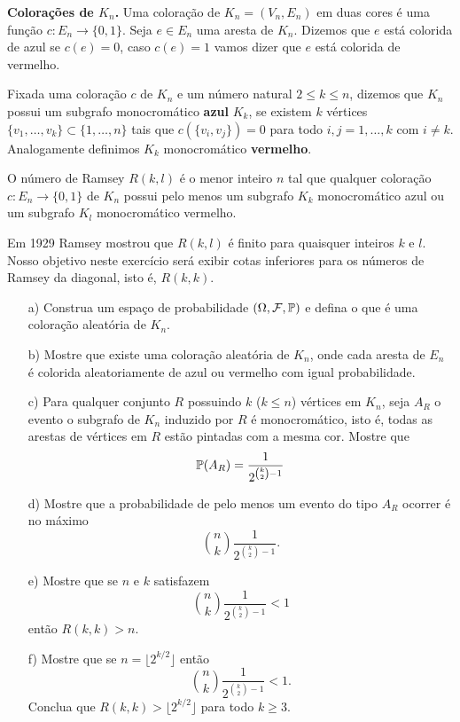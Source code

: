\begin{enumerate}[leftmargin=*]
{\bf Colorações de $K_n$.}
Uma coloração de $K_n=(V_n,E_n)$ em duas cores 
é uma função $c:E_n\to \{0,1\}$.
Seja $e\in E_n$ uma aresta de $K_n$. 
Dizemos que $e$ está colorida de azul se $c(e)=0$, 
caso $c(e)=1$ vamos dizer que $e$ está colorida de vermelho.

Fixada uma coloração $c$ de $K_n$ e um 
número natural $2\leq k \leq n$, 
dizemos que $K_n$ possui um subgrafo monocromático
{\bf azul} $K_k$, se existem $k$ vértices 
$\{v_1,\ldots,v_k\}\subset \{1,\ldots,n\}$
tais que $c(\{v_i,v_j\})=0$ para todo $i,j=1,\ldots,k$
com $i\neq k$. Analogamente definimos $K_k$ 
monocromático {\bf vermelho}.


O número de Ramsey $R(k,l)$ é o menor inteiro
$n$ tal que qualquer coloração $c:E_n\to\{0,1\}$
de $K_n$ possui pelo menos um subgrafo $K_k$ monocromático azul 
ou um subgrafo $K_l$ monocromático vermelho.

Em 1929 Ramsey mostrou que $R(k,l)$ é finito para 
quaisquer inteiros $k$ e $l$. 
Nosso objetivo neste exercício será 
exibir cotas inferiores para 
os números de Ramsey da diagonal, isto é, 
$R(k,k)$.

	\begin{itemize}
		\item[a)] 
		Construa um espaço de probabilidade 
		$(\Omega,\F,\P)$ e defina o que é uma coloração aleatória 
		de $K_n$. 
		
		\item[b)] Mostre que existe uma coloração aleatória de $K_n$,
		onde cada aresta de $E_n$ é colorida aleatoriamente
		de azul ou vermelho com igual probabilidade.
		
		\item[c)] Para qualquer conjunto $R$ possuindo $k$ ($k\leq n$)
		vértices em $K_n$, 
		seja $A_R$ o evento o subgrafo de $K_n$ induzido 
		por $R$ é monocromático, isto é, todas as arestas
		de vértices em $R$ estão pintadas com a mesma cor. 
		Mostre que
			\[ 
				\P(A_R) = \frac{1}{2^{\binom{k}{2}-1  }}
			\]
		
		\item[d)] Mostre que a probabilidade de pelo menos um 
		evento do tipo $A_R$ ocorrer é no máximo 
			\[
				\binom{n}{k}\frac{1}{2^{\binom{k}{2}-1  }}.
			\]
			
		\item[e)] Mostre que se $n$ e $k$ satisfazem
			\[
				\binom{n}{k}\frac{1}{2^{\binom{k}{2}-1  }} < 1
			\]
		então $R(k,k)> n$.
		
		\item[f)] Mostre que se $n=\lfloor 2^{k/2} \rfloor$ então
			\[
				\binom{n}{k}\frac{1}{2^{\binom{k}{2}-1  }} < 1.
			\]
		Conclua que $R(k,k)> \lfloor 2^{k/2} \rfloor $ para todo 
		$k\geq 3$.		
		

\end{itemize}
\end{enumerate}
